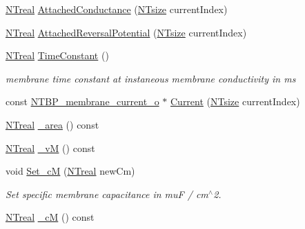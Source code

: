 \begin{DoxyCompactItemize}
\item 
\hyperlink{nt__types_8h_a814a97893e9deb1eedcc7604529ba80d}{NTreal} \hyperlink{class_n_t_b_p__membrane__compartment__o_a597e1d1d8af87681cb5180b894d95648}{AttachedConductance} (\hyperlink{nt__types_8h_a06c124f2e4469769b58230253ce0560b}{NTsize} currentIndex)
\item 
\hyperlink{nt__types_8h_a814a97893e9deb1eedcc7604529ba80d}{NTreal} \hyperlink{class_n_t_b_p__membrane__compartment__o_a5d54a0a47d8015334c42a7efc07fb223}{AttachedReversalPotential} (\hyperlink{nt__types_8h_a06c124f2e4469769b58230253ce0560b}{NTsize} currentIndex)
\item 
\hyperlink{nt__types_8h_a814a97893e9deb1eedcc7604529ba80d}{NTreal} \hyperlink{class_n_t_b_p__membrane__compartment__o_a333881ed1cf20329cf854baf29295149}{TimeConstant} ()
\begin{DoxyCompactList}\small\item\em membrane time constant at instaneous membrane conductivity in ms \item\end{DoxyCompactList}\item 
const \hyperlink{class_n_t_b_p__membrane__current__o}{NTBP\_\-membrane\_\-current\_\-o} $\ast$ \hyperlink{class_n_t_b_p__membrane__compartment__o_af3c8751e433f3e5c3ea8d7cbd7caa283}{Current} (\hyperlink{nt__types_8h_a06c124f2e4469769b58230253ce0560b}{NTsize} currentIndex)
\item 
\hyperlink{nt__types_8h_a814a97893e9deb1eedcc7604529ba80d}{NTreal} \hyperlink{class_n_t_b_p__membrane__compartment__o_a7fa4dafbbfde9968137b99268c11240f}{\_\-area} () const 
\item 
\hyperlink{nt__types_8h_a814a97893e9deb1eedcc7604529ba80d}{NTreal} \hyperlink{class_n_t_b_p__membrane__compartment__o_a5c258d1a8ebb1f053bc7886dd397e706}{\_\-vM} () const 
\item 
void \hyperlink{class_n_t_b_p__membrane__compartment__o_a9adb6fd5281e6f7559121a194fa82713}{Set\_\-cM} (\hyperlink{nt__types_8h_a814a97893e9deb1eedcc7604529ba80d}{NTreal} newCm)
\begin{DoxyCompactList}\small\item\em Set specific membrane capacitance in muF / cm$^\wedge$2. \item\end{DoxyCompactList}\item 
\hyperlink{nt__types_8h_a814a97893e9deb1eedcc7604529ba80d}{NTreal} \hyperlink{class_n_t_b_p__membrane__compartment__o_ab0ee815dcdad5d93ca73ea8be0d2e31d}{\_\-cM} () const 
\item 

\end{DoxyCompactItemize}
